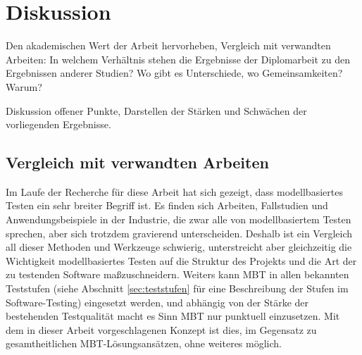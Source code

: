 \makeatletter\ifthesis@masterthesis
\chapter{Diskussion}
\label{sec:discussion}

Den akademischen Wert der Arbeit hervorheben, Vergleich mit verwandten Arbeiten: In welchem Verhältnis stehen die Ergebnisse der Diplomarbeit zu den Ergebnissen anderer Studien? Wo gibt es Unterschiede, wo Gemeinsamkeiten? Warum?

Diskussion offener Punkte, Darstellen der Stärken und Schwächen der vorliegenden Ergebnisse.

\section{Vergleich mit verwandten Arbeiten}
Im Laufe der Recherche für diese Arbeit hat sich gezeigt, dass modellbasiertes Testen ein sehr breiter Begriff ist. Es finden sich Arbeiten, Fallstudien und Anwendungsbeispiele in der Industrie, die zwar alle von modellbasiertem Testen sprechen, aber sich trotzdem gravierend unterscheiden. Deshalb ist ein Vergleich all dieser Methoden und Werkzeuge schwierig, unterstreicht aber gleichzeitig die Wichtigkeit modellbasiertes Testen auf die Struktur des Projekts und die Art der zu testenden Software maßzuschneidern. Weiters kann \Gls{MBT} in allen bekannten Teststufen (siehe Abschnitt \ref{sec:teststufen} für eine Beschreibung der Stufen im Software-Testing) eingesetzt werden, und abhängig von der Stärke der bestehenden Testqualität macht es Sinn \Gls{MBT} nur punktuell einzusetzen. Mit dem in dieser Arbeit vorgeschlagenen Konzept ist dies, im Gegensatz zu gesamtheitlichen MBT-Lösungsansätzen, ohne weiteres möglich.\\
